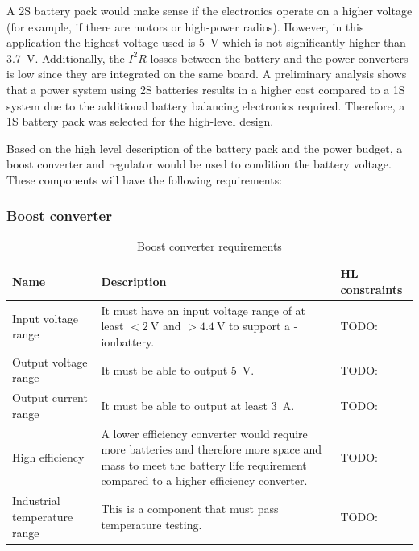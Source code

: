 \documentclass[draft]{report}
\newcommand{\liion}{\ce{Li}-ion}
\begin{document}
A 2S battery pack would make sense if the electronics operate on a higher voltage (for example, if there are motors or high-power radios). However, in this application the highest voltage used is \SI{5}{\volt} which is not significantly higher than \SI{3.7}{\volt}. Additionally, the $I^2R$ losses between the battery and the power converters is low since they are integrated on the same board. A preliminary analysis shows that a power system using 2S batteries results in a higher cost compared to a 1S system due to the additional battery balancing electronics required. Therefore, a 1S battery pack was selected for the high-level design.

Based on the high level description of the battery pack and the power budget, a boost converter and regulator would be used to condition the battery voltage. These components will have the following requirements:

\subsubsection{Boost converter}

\begin{table}[H]
  \centering
  \begin{tabular}{|L{0.2\textwidth}|L{0.495\textwidth}|L{0.2\textwidth}|}
    \hline
    \textbf{Name}                & \textbf{Description}                                                                                                                                                        & \textbf{HL constraints} \\ \hline
    Input voltage range          & It must have an input voltage range of at least $<\SI{2}{\volt}$ and $>\SI{4.4}{\volt}$ to support a \liion battery.                                                        & TODO:                   \\\hline
    Output voltage range         & It must be able to output \SI{5}{\volt}.                                                                                                                                    & TODO:                   \\\hline
    Output current range         & It must be able to output at least \SI{3}{\ampere}.                                                                                                                         & TODO:                   \\\hline
    High efficiency              & A lower efficiency converter would require more batteries and therefore more space and mass to meet the battery life requirement compared to a higher efficiency converter. & TODO:                   \\\hline
    Industrial temperature range & This is a component that must pass temperature testing.                                                                                                                     & TODO:                   \\\hline
  \end{tabular}
  \caption{Boost converter requirements}
  \label{tabl:boost-requirements}
\end{table}
\end{document}
